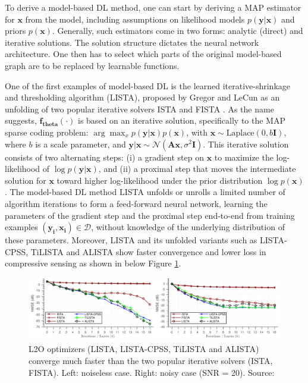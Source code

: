 To derive a model-based DL method, one can start by deriving a MAP estimator for $\mathbf{x}$ from the model, including assumptions on likelihood models $p(\mathbf{y|x})$ and priors $p(\mathbf{x})$. Generally, such estimators come in two forms: analytic (direct) and iterative solutions. The solution structure dictates the neural network architecture. One then has to select which parts of the original model-based graph are to be replaced by learnable functions.

One of the first examples of model-based DL is the learned iterative-shrinkage and thresholding algorithm (LISTA), proposed by Gregor and LeCun \cite{lista} as an unfolding of two popular iterative solvers ISTA and FISTA \cite{ista}. As the name suggests, $\mathbf{f_{theta}}(\cdot)$ is based on an iterative solution, specifically to the MAP sparse coding problem: $\arg\max_x p(\mathbf{y|x})p(\mathbf{x})$, with $\mathbf{x} \sim \text{Laplace}(0, b\mathbf{I})$, where $b$ is a scale parameter, and $\mathbf{y|x} \sim \mathcal{N}(\mathbf{Ax}, \sigma^2\mathbf{I})$. This iterative solution consists of two alternating steps: (i) a gradient step on $\mathbf{x}$ to maximize the log-likelihood of $\log p(\mathbf{y|x})$, and (ii) a proximal step that moves the intermediate solution for $\mathbf{x}$ toward higher log-likelihood under the prior distribution $\log p(\mathbf{x})$. The model-based DL method LISTA unfolds or unrolls a limited number of algorithm iterations to form a feed-forward neural network, learning the parameters of the gradient step and the proximal step end-to-end from training examples $(\mathbf{y_i}, \mathbf{x_i}) \in \mathcal{D}$, without knowledge of the underlying distribution of these parameters. Moreover, LISTA and its unfolded variants such as LISTA-CPSS, TiLISTA and ALISTA show faster convergence and lower loss in compressive sensing as shown in below Figure \ref{fig: lista}.  

\begin{figure}[htbp]
  \centering
  \includegraphics[width=\textwidth]{./Figures/lista.png}
  \caption{L2O optimizers (LISTA, LISTA-CPSS, TiLISTA and ALISTA) converge much faster than the two popular iterative solvers (ISTA, FISTA). Left: noiseless case. Right: noisy case (SNR = 20). Source: \cite{liu2019alista}}
  \label{fig: lista}
\end{figure}

